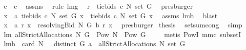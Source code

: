 \begin{isabellebody}
\isamarkupfalse%
\ {\isachardoublequoteopen}{\isacharquery}c{\isacharprime}\ {\isacharequal}\ {\isacharquery}c{\isachardoublequoteclose}\ \isamarkupfalse%
\ assms{\isacharparenleft}{}{\isacharcomma}{}{\isacharparenright}\ \isamarkupfalse%
\ {\isacharparenleft}rule\ lm{}{}g{\isacharparenright}\ \isamarkupfalse%
\isanewline
{}\isamarkupfalse%
\ {\isachardoublequoteopen}{\isacharquery}r{\isacharprime}\ {\isacharequal}\ tiebids{\isacharprime}\ {\isacharquery}c\ N\ {\isacharparenleft}set\ G{\isacharparenright}{\isachardoublequoteclose}\ \isamarkupfalse%
\ presburger\isanewline
{}\isamarkupfalse%
\ \isamarkupfalse%
\ {\isachardoublequoteopen}{\isasymforall}x\ {\isasymin}\ a{\isachardot}\ tiebids{\isacharprime}\ {\isacharquery}c\ N\ {\isacharparenleft}set\ G{\isacharparenright}\ x\ {\isacharequal}\ tiebids\ {\isacharquery}c\ N\ {\isacharparenleft}set\ G{\isacharparenright}\ x{\isachardoublequoteclose}\ \isamarkupfalse%
\ assms{\isacharparenleft}{}{\isacharparenright}\ lm{}{}b\ \isamarkupfalse%
\ blast\isanewline
{}\isamarkupfalse%
\ \isamarkupfalse%
\ {\isachardoublequoteopen}{\isasymforall}x\ {\isasymin}\ a{\isachardot}\ {\isacharquery}r{\isacharprime}\ x\ {\isacharequal}\ resolvingBid\ N\ G\ b\ r\ x{\isachardoublequoteclose}\ \isamarkupfalse%
\ presburger\isanewline
{}\isamarkupfalse%
\ {\isacharquery}thesis\ \isamarkupfalse%
\ setsum{\isachardot}cong\ \isamarkupfalse%
\ simp\isanewline
{}\isamarkupfalse%
%
\endisatagproof
{\isafoldproof}%
%
\isadelimproof
\isanewline
%
\endisadelimproof
{}\isamarkupfalse%
\ lm{}{}{\isacharcolon}\ {\isachardoublequoteopen}allStrictAllocations{\isacharprime}\ N\ G\ {\isasymsubseteq}\ Pow\ {\isacharparenleft}N\ {\isasymtimes}\ {\isacharparenleft}Pow\ G\ {\isacharminus}\ {\isacharbraceleft}{\isacharbraceleft}{\isacharbraceright}{\isacharbraceright}{\isacharparenright}{\isacharparenright}{\isachardoublequoteclose}%
\isadelimproof
\ %
\endisadelimproof
%
\isatagproof
{}\isamarkupfalse%
\ {\isacharparenleft}metis\ PowI\ mm{}{}c\ subsetI{\isacharparenright}%
\endisatagproof
{\isafoldproof}%
%
\isadelimproof
%
\endisadelimproof
\isanewline
{}\isamarkupfalse%
\ lm{}{}b{\isacharcolon}\ \ {\isachardoublequoteopen}card\ N\ {\isachargreater}\ {}{\isachardoublequoteclose}\ {\isachardoublequoteopen}distinct\ G{\isachardoublequoteclose}\ {\isachardoublequoteopen}a\ {\isasymin}\ allStrictAllocations{\isacharprime}\ N\ {\isacharparenleft}set\ G{\isacharparenright}{\isachardoublequoteclose}\ \isanewline

\end{isabellebody}
